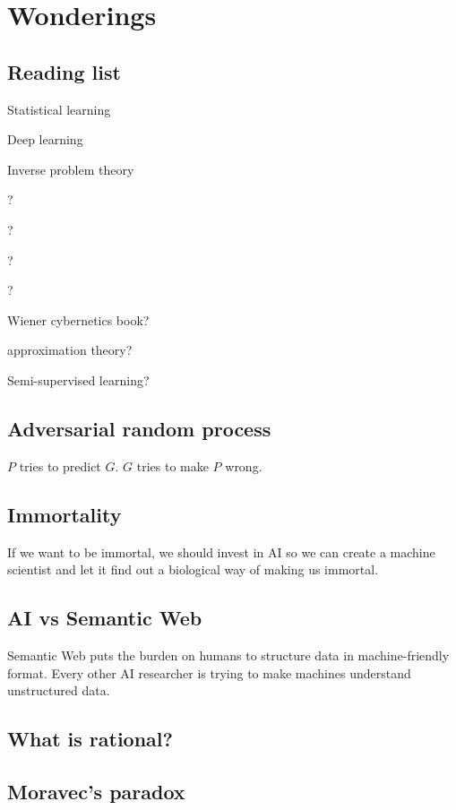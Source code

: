 \chapter{Wonderings}

\section{Reading list}

Statistical learning

Deep learning \cite{DeepLearning}

Inverse problem theory \cite{tarantola2005inverse}

? \cite{DeepArch}

? \cite{RepLearn}

? \cite{SuttonBartoRein}

? \cite{SepLogicAi}

Wiener cybernetics book? \cite{WienerCyber}

approximation theory? \cite{ApproxThePrac}

Semi-supervised learning?

\section{Adversarial random process}

\(P\) tries to predict \(G\).
\(G\) tries to make \(P\) wrong.

\section{Immortality}

If we want to be immortal,
we should invest in AI so we can create a machine scientist
and let it find out a biological way of making us immortal.

\section{AI vs Semantic Web}

Semantic Web puts the burden on humans to structure data in machine-friendly format.
Every other AI researcher is trying to make machines understand unstructured data.

\section{What is rational?}

\section{Moravec's paradox}


